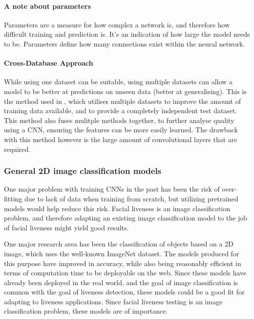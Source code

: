 \documentclass[10pt,a4paper]{article}
\begin{document}
        \paragraph{A note about parameters}
        Parameters are a measure for how complex a network is, and therefore how difficult training and prediction is. It's an indication of how large the model needs to be. Parameters define how many connections exist within the neural network.

        \paragraph{Cross-Database Approach}
        While using one dataset can be suitable, using multiple datasets can allow a model to be better at predictions on unseen data (better at generalising). This is the method used in \cite{Patel2016CrossDatabaseFA}, which utilises multiple datasets to improve the amount of training data available, and to provide a completely independent test dataset.
        This method also fuses mulitple methods together, to further analyse quality using a CNN, ensuring the features can be
        more easily learned. The drawback with this method however is the large amount of convolutional layers that are required. 
        
        \subsubsection{General 2D image classification models}
        One major problem with training CNNs in the past has been the risk of over-fitting due to lack of data when training from scratch, but utilizing pretrained models would help reduce this risk.
        Facial liveness is an image classification problem, and therefore adapting an existing image classification model to the job of facial liveness might yield good results. 

        One major research area has been the classification of objects based on a 2D image, which uses the well-known ImageNet dataset. The models produced for this purpose have improved in accuracy,
        while also being reasonably efficient in terms of computation time to be deployable on the web. Since these models have already been deployed in the real world, and the goal of image classification
        is common with the goal of liveness detection, these models could be a good fit for adapting to liveness applications. Since facial liveness testing is
        an image classification problem, these models are of importance.
            
\end{document}
